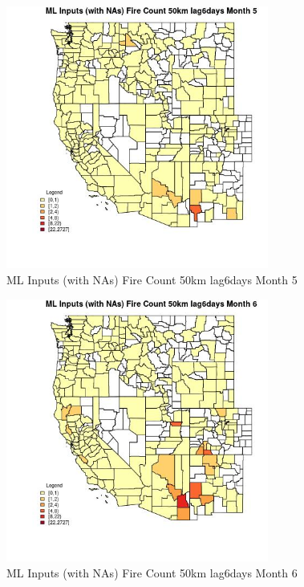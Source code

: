 \begin{figure} 
\centering  
\includegraphics[width=0.77\textwidth]{Code_Outputs/Report_ML_input_PM25_Step4_part_f_de_duplicated_aves_prioritize_24hr_obswNAs_CountyFire_Count_50km_lag6daysmedianMonth5.jpg} 
\caption{\label{fig:Report_ML_input_PM25_Step4_part_f_de_duplicated_aves_prioritize_24hr_obswNAsCountyFire_Count_50km_lag6daysmedianMonth5}ML Inputs (with NAs) Fire Count 50km lag6days Month 5} 
\end{figure} 
 

\begin{figure} 
\centering  
\includegraphics[width=0.77\textwidth]{Code_Outputs/Report_ML_input_PM25_Step4_part_f_de_duplicated_aves_prioritize_24hr_obswNAs_CountyFire_Count_50km_lag6daysmedianMonth6.jpg} 
\caption{\label{fig:Report_ML_input_PM25_Step4_part_f_de_duplicated_aves_prioritize_24hr_obswNAsCountyFire_Count_50km_lag6daysmedianMonth6}ML Inputs (with NAs) Fire Count 50km lag6days Month 6} 
\end{figure} 
 

